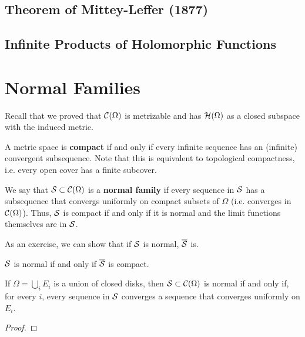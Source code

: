 \documentclass{article}
\begin{document}
\subsection{Theorem of Mittey-Leffer (1877)}

\subsection{Infinite Products of Holomorphic Functions}

\section{Normal Families}

Recall that we proved that \(\mathcal{C}(\Omega)\) is metrizable and has \(\mathcal{H}(\Omega)\) as a closed subspace with the induced metric.
\begin{definition}
A metric space is \textbf{compact} if and only if every infinite sequence has an (infinite) convergent subsequence. Note that this is equivalent to topological compactness, i.e. every open cover has a finite subcover.
\end{definition}
\begin{definition}
We say that \(\mathcal{S} \subset \mathcal{C}(\Omega)\) is a \textbf{normal family} if every sequence in \(\mathcal{S}\) has a subsequence that convergs uniformly on compact subsets of \(\Omega\) (i.e. converges in \(\mathcal{C}(\Omega)\)). Thus, \(\mathcal{S}\) is compact if and only if it is normal and the limit functions themselves are in \(\mathcal{S}\).
\end{definition}
As an exercise, we can show that if \(\mathcal{S}\) is normal, \(\overline{\mathcal{S}}\) is.
\begin{lemma}
\(\mathcal{S}\) is normal if and only if \(\overline{\mathcal{S}}\) is compact.
\end{lemma}
\begin{lemma}
If \(\Omega = \bigcup_iE_i\) is a union of closed disks, then \(\mathcal{S} \subset \mathcal{C}(\Omega)\) is normal if and only if, for every \(i\), every sequence in \(\mathcal{S}\) converges a sequence that converges uniformly on \(E_i\).
\end{lemma}
\begin{proof}
\end{proof}

\end{document}
